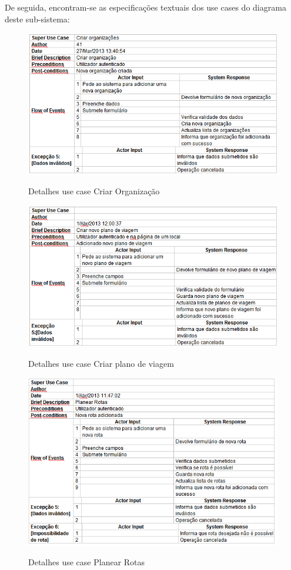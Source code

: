 ﻿\documentclass[12pt,a4paper]{article}
\begin{document}
De seguida, encontram-se as especificações textuais dos use cases do diagrama deste sub-sistema:\\

\begin{figure}[h!]
\centering
\includegraphics[scale=0.7]{d_usecase/criarorganizacao}
\label{usecase}
\caption{Detalhes use case Criar Organização}
\end{figure}

\begin{figure}[h!]
\centering
\includegraphics[scale=0.7]{d_usecase/criarviagem}
\label{usecase}
\caption{Detalhes use case Criar plano de viagem}
\end{figure}

\begin{figure}[h!]
\centering
\includegraphics[scale=0.7]{d_usecase/planearrota}
\label{usecase}
\caption{Detalhes use case Planear Rotas}
\end{figure}
\end{document}

